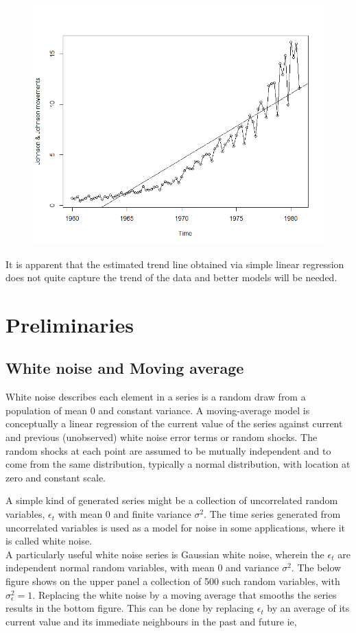 \documentclass[a4paper]{article}
\theoremstyle{definition}
\begin{document}
\begin{figure}
	[h]
	\includegraphics[width=0.9\linewidth]{../Beamer/linearreg}
\end{figure}

It is apparent that the estimated trend line obtained via simple linear regression does not
quite capture the trend of the data and better models will be needed. 					

\section{Preliminaries}
\subsection{White noise and Moving average}
White noise describes each element in a series is a random draw from a population of mean 0 and constant variance. A moving-average model is conceptually a linear regression of the current value of the series against current and previous (unobserved) white noise error terms or random shocks. The random shocks at each point are assumed to be mutually independent and to come from the same distribution, typically a normal distribution, with location at zero and constant scale. 


A simple kind of generated series might be a collection of uncorrelated random variables, $ \epsilon_t $ with mean $ 0 $ and finite variance $ \sigma^2 $. The time series generated from uncorrelated variables is used as a model for noise in some applications, where it is called white noise. \\
A particularly useful white noise series is Gaussian white noise, wherein the $ \epsilon_t $ are independent normal random variables, with mean $ 0 $ and variance $ \sigma^2 $.  
The below figure shows on the upper panel a collection of 500 such random variables, with $ \sigma_\epsilon^{2} = 1$. Replacing the white noise by a moving average that smooths the series results in the bottom figure. This can be done by replacing $ \epsilon_t $ by an average
of its current value and its immediate neighbours in the past and future ie,
\end{document}
